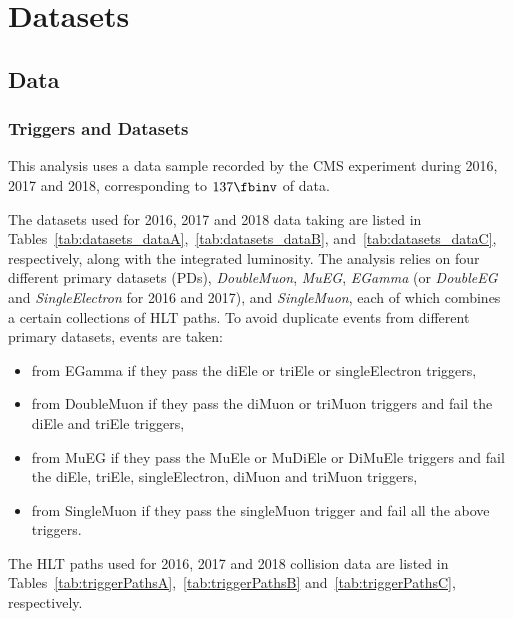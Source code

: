 
\section{Datasets}

\subsection{Data}

\subsubsection{Triggers and Datasets}
\label{sec:trigpaths}


This analysis uses a data sample recorded by the CMS experiment during 2016, 2017 and 2018, corresponding to $\usedLumiABC$ of data.  

The datasets used for 2016, 2017 and 2018 data taking are listed in Tables~\ref{tab:datasets_dataA},~\ref{tab:datasets_dataB}, and~\ref{tab:datasets_dataC}, respectively, along with the integrated luminosity. 
The analysis relies on four different primary datasets (PDs), {\it DoubleMuon}, {\it MuEG}, {\it EGamma} (or {\it DoubleEG} and {\it SingleElectron} for 2016 and 2017), and {\it SingleMuon},
each of which combines a certain collections of HLT paths. 
To avoid duplicate events from different primary datasets, events are taken: 
\begin{itemize}
\item from EGamma if they pass the diEle or triEle or singleElectron triggers,
\item from DoubleMuon if they pass the diMuon or triMuon triggers and fail the diEle and triEle triggers,
\item from MuEG if they pass the MuEle or MuDiEle or DiMuEle triggers and fail the diEle, triEle, singleElectron, diMuon and triMuon triggers,
\item from SingleMuon if they pass the singleMuon trigger and fail all the above triggers. 
\end{itemize} 

The HLT paths used for 2016, 2017 and 2018 collision data are listed in Tables~\ref{tab:triggerPathsA},~\ref{tab:triggerPathsB} and~\ref{tab:triggerPathsC}, respectively.

